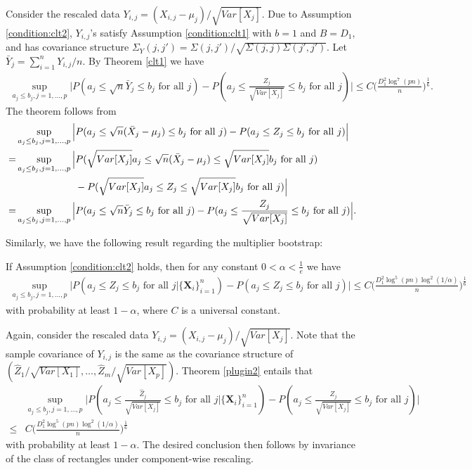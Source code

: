 \documentclass[mnsc,blindrev]{informs4} %
\begin{document}
 Consider the rescaled data $Y_{i,j}=(X_{i,j}-\mu_j)/\sqrt{Var[X_j]}$. Due to Assumption \ref{condition:clt2}, $Y_{i,j}$'s satisfy Assumption \ref{condition:clt1} with $b=1$ and $B=D_1$, and has covariance structure $\Sigma_Y(j,j')=\Sigma(j,j')/\sqrt{\Sigma(j,j)\Sigma(j',j')}$. Let $\bar{Y}_j=\sum_{i=1}^nY_{i,j}/n$. By Theorem \ref{clt1} we have
\begin{align*}
\sup_{a_j\leq b_j,j=1,\ldots,p}\Big\lvert P(a_j\leq \sqrt n\bar{Y}_j\leq b_j\text{ for all }j)-P(a_j\leq \frac{Z_j}{\sqrt{Var[X_j]}}\leq b_j\text{ for all }j)\Big\rvert\leq C\Big(\frac{D_1^2\log^7(pn)}{n}\Big)^{\frac{1}{6}}.
\end{align*}
The theorem follows from
\begin{align*}
&\sup_{a_j\leq b_j,j=1,\ldots,p}\Big\lvert P(a_j\leq \sqrt n(\bar{X}_j-\mu_j)\leq b_j\text{ for all }j)-P(a_j\leq Z_j\leq b_j\text{ for all }j)\Big\rvert\\
=&\sup_{a_j\leq b_j,j=1,\ldots,p}\Big\lvert P(\sqrt{Var[X_j]}a_j\leq \sqrt n(\bar{X}_j-\mu_j)\leq \sqrt{Var[X_j]}b_j\text{ for all }j)\\
&\hspace{14ex}-P(\sqrt{Var[X_j]}a_j\leq Z_j\leq \sqrt{Var[X_j]}b_j\text{ for all }j)\Big\rvert\\
=&\sup_{a_j\leq b_j,j=1,\ldots,p}\Big\lvert P(a_j\leq \sqrt n\bar{Y}_j\leq b_j\text{ for all }j)-P(a_j\leq \frac{Z_j}{\sqrt{Var[X_j]}}\leq b_j\text{ for all }j)\Big\rvert.
\end{align*}\hfill\Halmos

Similarly, we have the following result regarding the multiplier bootstrap:
\begin{theorem}\label{plugin2}
If Assumption \ref{condition:clt2} holds, then for any constant $0<\alpha<\frac{1}{e}$ we have
\begin{align*}
\sup_{a_j\leq b_j,j=1,\ldots,p}\Big\lvert P(a_j\leq \widehat{Z}_j\leq b_j\text{ for all }j\vert \{\mathbf X_i\}_{i=1}^n)-P(a_j\leq Z_j\leq b_j\text{ for all }j)\Big\rvert\leq C\Big(\frac{D_1^2\log^5(pn)\log^2(1/\alpha)}{n}\Big)^{\frac{1}{6}}
\end{align*}
with probability at least $1-\alpha$, where $C$ is a universal constant.
\end{theorem}
 Again, consider the rescaled data $Y_{i,j}=(X_{i,j}-\mu_j)/\sqrt{Var[X_j]}$. Note that the sample covariance of $Y_{i,j}$ is the same as the covariance structure of $(\widehat{Z}_1/\sqrt{Var[X_1]},\ldots,\widehat{Z}_m/\sqrt{Var[X_p]})$. Theorem \ref{plugin2} entails that
\begin{align*}
&\sup_{a_j\leq b_j,j=1,\ldots,p}\Big\lvert P(a_j\leq \frac{\widehat{Z}_j}{\sqrt{Var[X_j]}}\leq b_j\text{ for all }j\vert \{\mathbf X_i\}_{i=1}^n)-P(a_j\leq \frac{Z_j}{\sqrt{Var[X_j]}}\leq b_j\text{ for all }j)\Big\rvert\\
\leq& C\Big(\frac{D_1^2\log^5(pn)\log^2(1/\alpha)}{n}\Big)^{\frac{1}{6}}
\end{align*}
with probability at least $1-\alpha$. The desired conclusion then follows by invariance of the class of rectangles under component-wise rescaling.\hfill\Halmos
\end{document}
